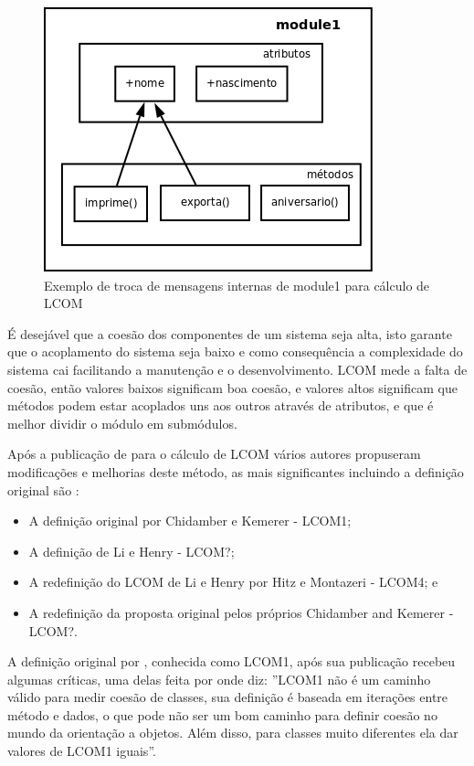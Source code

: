 \begin{figure}[h]
\center
\includegraphics[scale=0.4]{imagens/exemplo-lcom}
\caption{Exemplo de troca de mensagens internas de module1 para cálculo de LCOM}
\label{fig:exemplo-lcom}
\end{figure}

É desejável que a coesão dos componentes de um sistema seja alta, isto garante
que o acoplamento do sistema seja baixo e como consequência a complexidade do
sistema cai facilitando a manutenção e o desenvolvimento. LCOM mede a falta de
coesão, então valores baixos significam boa coesão, e valores altos significam
que métodos podem estar acoplados uns aos outros através de atributos, e que é
melhor dividir o módulo em submódulos\cite{observationsOnLCOM}.

Após a publicação de  para o cálculo de LCOM vários
autores propuseram modificações e melhorias deste método, as mais significantes
incluindo a definição original são \cite{principalComponentAnalysisOfLCOM}:

\begin{itemize}
\item A definição original por Chidamber e Kemerer - LCOM1;
\item A definição de Li e Henry - LCOM?;
\item A redefinição do LCOM de Li e Henry por Hitz e Montazeri - LCOM4; e
\item A redefinição da proposta original pelos próprios Chidamber and Kemerer - LCOM?.
\end{itemize}

A definição original por ,
conhecida como LCOM1, após sua publicação recebeu algumas críticas, uma delas
feita por  onde diz: ''LCOM1 não é um caminho
válido para medir coesão de classes, sua definição é baseada em iterações entre
método e dados, o que pode não ser um bom caminho para definir coesão no mundo
da orientação a objetos. Além disso, para classes muito diferentes ela dar
valores de LCOM1 iguais''.

